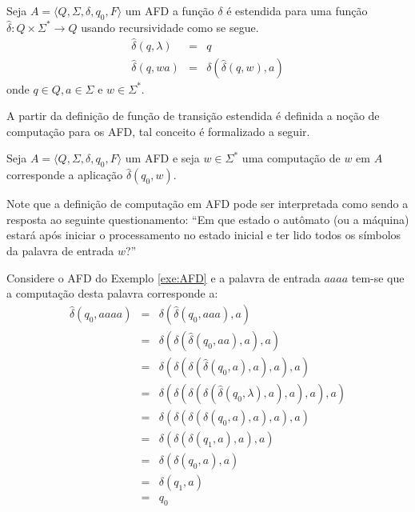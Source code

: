 \begin{definition}
	Seja $A = \langle Q, \Sigma, \delta, q_0, F\rangle$ um AFD a função $\delta$ é estendida para uma função $\widehat{\delta}: Q \times \Sigma^* \rightarrow Q$ usando recursividade como se segue.
	\begin{eqnarray}\label{eq:ExtensaoDaFuncaoTransicaoDelta}
		\widehat{\delta}(q, \lambda)& = & q \\
		\widehat{\delta}(q, wa)& = & \delta(\widehat{\delta}(q, w), a)	
	\end{eqnarray}
	onde $q \in Q, a \in \Sigma$ e $w \in \Sigma^*$.
\end{definition}

A partir da definição de função de transição estendida é definida  a noção de computação para os AFD, tal conceito é formalizado a seguir.

\begin{definition}\label{def:ComputacaoAFD}
	Seja $A = \langle Q, \Sigma, \delta, q_0, F\rangle$ um AFD e seja $w \in \Sigma^*$ uma computação de $w$ em $A$ corresponde a aplicação $\widehat{\delta}(q_0, w)$.
\end{definition}

Note que a definição de computação em AFD pode ser interpretada como sendo a resposta ao seguinte questionamento: ``Em que estado o autômato (ou a máquina) estará após iniciar o processamento no estado inicial e ter lido todos os símbolos da palavra de entrada $w$?''

\begin{exem}\label{exe:ComputacaoAFD1}
	Considere o AFD do Exemplo \ref{exe:AFD} e a palavra de entrada $aaaa$ tem-se que a computação desta palavra corresponde a:
	\begin{eqnarray*}
		\widehat{\delta}(q_0, aaaa) & = & \delta(\widehat{\delta}(q_0, aaa), a)\\
		& = & \delta(\delta(\widehat{\delta}(q_0, aa), a), a)\\
		& = & \delta(\delta(\delta(\widehat{\delta}(q_0, a), a), a), a)\\
		& = & \delta(\delta(\delta(\delta(\widehat{\delta}(q_0, \lambda), a), a), a), a)\\
		& = & \delta(\delta(\delta(\delta(q_0, a), a), a), a)\\
		& = & \delta(\delta(\delta(q_1, a), a), a)\\
		& = & \delta(\delta(q_0, a), a)\\
		& = & \delta(q_1, a)\\
		& = & q_0
	\end{eqnarray*}
\end{exem}

